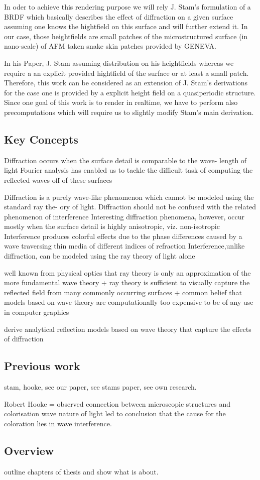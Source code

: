 In oder to achieve this rendering purpose we will rely J. Stam's formulation of a BRDF which basically describes the effect of diffraction on a given surface assuming one knows the hightfield on this surface and will further extend it. 
In our case, those heightfields are small patches of the microstructured surface (in nano-scale) of AFM taken snake skin patches provided by GENEVA.

In his Paper, J. Stam assuming distribution on his heightfields whereas we require a an explicit provided hightfield of the surface or at least a small patch. Therefore, this work can be considered as an extension of J. Stam's derivations for the case one is provided by a explicit height field on a quasiperiodic structure.
Since one goal of this work is to render in realtime, we have to perform also precomputations which will require us to slightly modify Stam's main derivation.


\subsection{Key Concepts}

Diffraction occurs when the surface detail is comparable to the wave- length of light
Fourier analysis has enabled us to tackle the difficult task of computing the reflected waves off of these surfaces

Diffraction is a purely wave-like phenomenon which cannot be modeled using the standard ray the- ory of light.
Diffraction should not be confused with the related phenomenon of interference
Interesting diffraction phenomena, however, occur mostly when the surface detail is highly anisotropic, viz. non-isotropic
Interference produces colorful effects due to the phase differences caused by a wave traversing thin media of different indices of refraction
Interference,unlike diffraction, can be modeled using the ray theory of light alone

well known from physical optics that ray theory is only an approximation of the more fundamental wave theory
+ ray theory is sufficient to visually capture the reflected field from many commonly occurring surfaces
+ common belief that models based on wave theory are computationally too expensive to be of any use in computer graphics

derive analytical reflection models based on wave theory that capture the effects of diffraction


\subsection{Previous work}
stam, hooke, see our paper, see stams paper, see own research.


Robert Hooke = observed connection between microscopic structures and colorisation
wave nature of light led to conclusion that the cause for the coloration lies in wave interference.

\subsection{Overview}
outline chapters of thesis and show what is about.













